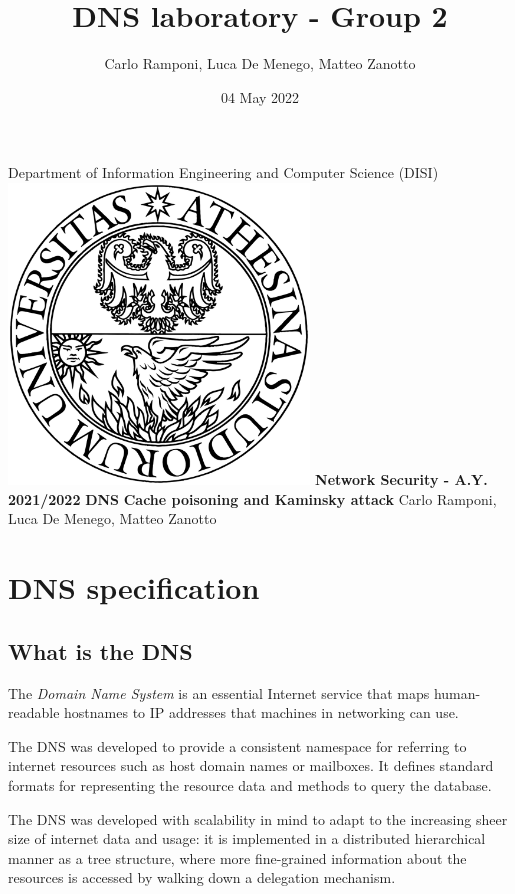 \documentclass[11pt,a4paper]{article}
\title{DNS laboratory - Group 2}
\author{Carlo Ramponi, Luca De Menego, Matteo Zanotto}
\date{04 May 2022}
\begin{document}
\begin{titlepage}

\centering
    \vfill
    \vskip3cm
    \Large Department of Information Engineering and Computer Science
    \vskip0.5cm
    \Large (DISI)
    \vskip2cm
    \includegraphics[width=8cm]{logo_unitn.png}
    \vskip2cm
    \textbf{\Large Network Security - A.Y. 2021/2022}
    \vskip2cm
    \textbf{\LARGE DNS}
    \vskip0.2cm
    \textbf{\LARGE Cache poisoning and Kaminsky attack}
    \vskip4cm
    \Large Carlo Ramponi, Luca De Menego, Matteo Zanotto
    \vfill

\end{titlepage}

\clearpage

\tableofcontents

\clearpage

\section{DNS specification}

\subsection{What is the DNS}

The \emph{Domain Name System} is an essential Internet service that maps human-readable hostnames to IP addresses that machines in networking can use.

\noindent
The DNS was developed to provide a consistent namespace for referring to internet resources such as host domain names or mailboxes. It defines standard formats for representing the resource data and methods to query the database.

\hfill \break
\noindent
The DNS was developed with scalability in mind to adapt to the increasing sheer size of internet data and usage: it is implemented in a distributed hierarchical manner as a tree structure, where
more fine-grained information about the resources is accessed by walking down a delegation mechanism.
\end{document}
